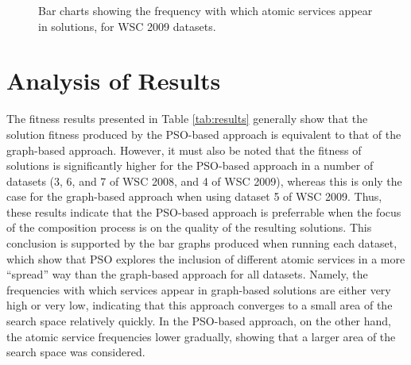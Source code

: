 \documentclass{llncs}
\begin{document}
\begin{figure}[h]
\centerline{
}
 \caption{Bar charts showing the frequency with which atomic services appear in solutions, for WSC 2009 datasets.}
 \label{bar_charts2009}
\end{figure}

\section{Analysis of Results}

The fitness results presented in Table \ref{tab:results} generally show that the solution fitness produced by the PSO-based approach is equivalent to that of the graph-based approach. However, it must also be noted that the fitness of solutions is significantly higher for the PSO-based approach in a number of datasets (3, 6, and 7 of WSC 2008, and 4 of WSC 2009), whereas this is only the case for the graph-based approach when using dataset 5 of WSC 2009. Thus, these results indicate that the PSO-based approach is preferrable when the focus of the composition process is on the quality of the resulting solutions. This conclusion is supported by the bar graphs produced when running each dataset, which show that PSO explores the inclusion of different atomic services in a more ``spread'' way than the graph-based approach for all datasets. Namely, the frequencies with which services appear in graph-based solutions are either very high or very low, indicating that this approach converges to a small area of the search space relatively quickly. In the PSO-based approach, on the other hand, the atomic service frequencies lower gradually, showing that a larger area of the search space was considered.
\end{document}
